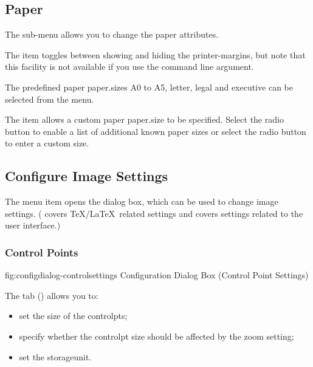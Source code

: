 \subsection{Paper}\label{sec:papermenu}


The  sub-menu allows you to change
the \gls{paper} attributes.


The  item toggles between showing
and hiding the \glspl{printer-margin}, but note that this facility is not
available if you use the  command line
argument.

The predefined paper \glspl{paper.size} A0 to A5, letter, legal and executive
can be selected from the  menu.


The  item allows a custom paper \gls{paper.size} to
be specified.  Select the   radio button to
enable a list of additional known paper sizes or select the
 radio button to enter a custom size.


\subsection{Configure Image Settings}\label{sec:configuredialog}


The  menu item opens the 
dialog box, which can be used to change image settings.
( covers \TeX\slash\LaTeX\ related settings and
 covers settings related to the user
interface.)


\subsubsection{Control Points}\label{sec:controlsettings}


\FloatFig
  {fig:configdialog-controlsettings}
  {}
  {Configuration Dialog Box (Control Point Settings)}

The  tab
()
allows you to:
\begin{itemize}
 \item set the size of the \glspl{controlpt};
 \item specify whether the \gls{controlpt} size should be affected by
the zoom setting;
 \item set the \gls{storageunit}.
\end{itemize}

